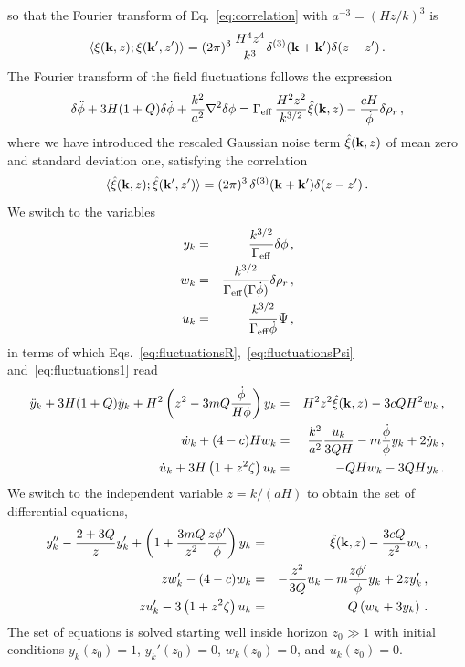 so that the Fourier transform of Eq.~\eqref{eq:correlation} with $a^{-3} = (Hz/k)^3$ is
\begin{equation}
	\label{eq:correlation1}
	\langle\xi({\bf k}, z); \xi({\bf k'}, z') \rangle = (2\pi)^3\,\frac{H^4z^4}{k^3} \delta^{(3)}({\bf k} + {\bf k'})\delta(z - z')\,.
\end{equation}
The Fourier transform of the field fluctuations follows the expression
\begin{equation}
	\label{eq:fluctuations1}
	\delta\ddot\phi + 3H(1+Q) \delta\dot\phi + \frac{k^2}{a^2}\nabla^2\delta\phi = \Gamma_{\rm eff}\,\frac{H^2z^2}{k^{3/2}}\hat\xi({\bf k}, z) - \frac{cH}{\dot\phi}\delta\rho_r\,,
\end{equation}
where we have introduced the rescaled Gaussian noise term $\hat\xi({\bf k}, z)$ of mean zero and standard deviation one, satisfying the correlation
\begin{equation}
	\label{eq:correlation2}
	\langle\hat\xi({\bf k}, z); \hat\xi({\bf k'}, z') \rangle = (2\pi)^3\, \delta^{(3)}({\bf k} + {\bf k'})\delta(z - z')\,.
\end{equation}
We switch to the variables
\begin{eqnarray}
	y_k &=& \frac{k^{3/2}}{\Gamma_{\rm eff}}\delta\phi\,,\\
	w_k &=& \frac{k^{3/2}}{\Gamma_{\rm eff}(\Gamma\dot\phi)}\delta\rho_r\,,\\
	u_k &=& \frac{k^{3/2}}{\Gamma_{\rm eff}\dot\phi}\Psi\,,	
\end{eqnarray}
in terms of which Eqs.~\eqref{eq:fluctuationsR},~\eqref{eq:fluctuationsPsi} and~\eqref{eq:fluctuations1} read
\begin{eqnarray}
	\ddot y_k + 3H(1+Q) \dot y_k + H^2\left(z^2 - 3 m Q \frac{\dot\phi}{H \phi}\right)y_k &=& H^2z^2 \hat\xi({\bf k}, z) - 3cQH^2w_k\,,\label{eq:fluctuationsphi1}\\
	\dot w_k + (4-c)H w_k &=& \frac{k^2}{a^2}\frac{u_k}{3QH} - m \frac{\dot\phi}{\phi} y_k + 2\dot y_k\,,\label{eq:fluctuationsR1}\\
	\dot u_k + 3H\left(1+z^2\zeta\right)u_k &=& - QHw_k - 3QHy_k\,.\label{eq:fluctuationsPsi1}
\end{eqnarray}
We switch to the independent variable $z = k/(aH)$ to obtain the set of differential equations,
\begin{eqnarray}
	y_k'' - \frac{2+3Q}{z}y_k' + \left(1 + \frac{3 m Q}{z^2} \frac{z\phi'}{\phi}\right)y_k &=& \hat\xi({\bf k}, z) - \frac{3cQ}{z^2}w_k\,,\label{eq:fluctuationsphi2}\\
	zw_k' - (4-c)w_k &=& -\frac{z^2}{3Q}u_k - m \frac{z\phi'}{\phi} y_k + 2zy_k'\,,\label{eq:fluctuationsR2}\\
	zu_k' - 3\left(1+z^2\zeta\right)u_k &=& Q\left(w_k + 3y_k\right)\,.\label{eq:fluctuationsPsi2}
\end{eqnarray}
The set of equations is solved starting well inside horizon $z_0 \gg 1$ with initial conditions $y_k(z_0) = 1$, $y_k'(z_0)= 0$, $w_k(z_0) = 0$, and $u_k(z_0) = 0$.

